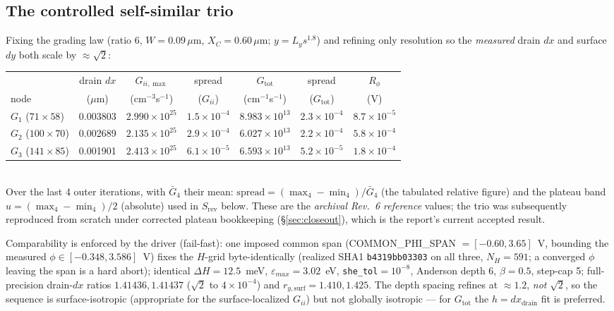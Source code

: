 \documentclass[11pt]{article}
\newcommand{\eps}{\varepsilon}
\begin{document}
\subsection{The controlled self-similar trio}
Fixing the grading law (ratio $6$, $W=0.09\,\mu$m, $X_C=0.60\,\mu$m; $y=L_y s^{1.8}$) and refining
only resolution so the \emph{measured} drain $dx$ and surface $dy$ both scale by $\approx\sqrt2$:
\begin{center}\small
\begin{tabular}{lcccccc}
\toprule
 & drain $dx$ & $G_{ii,\max}$ & spread & $G_{\mathrm{tot}}$ & spread & $R_\phi$\\
node & ($\mu$m) & (cm$^{-3}$s$^{-1}$) & ($G_{ii}$) & (cm$^{-1}$s$^{-1}$) & ($G_{\mathrm{tot}}$) & (V)\\
\midrule
$G_1$ ($71\times58$)  & 0.003803 & $2.990\times10^{25}$ & $1.5\times10^{-4}$ & $8.983\times10^{13}$ & $2.3\times10^{-4}$ & $8.7\times10^{-5}$\\
$G_2$ ($100\times70$) & 0.002689 & $2.135\times10^{25}$ & $2.9\times10^{-4}$ & $6.027\times10^{13}$ & $2.2\times10^{-4}$ & $5.8\times10^{-4}$\\
$G_3$ ($141\times85$) & 0.001901 & $2.413\times10^{25}$ & $6.1\times10^{-5}$ & $6.593\times10^{13}$ & $5.2\times10^{-5}$ & $1.8\times10^{-4}$\\
\bottomrule
\end{tabular}
\\[3pt]
{\footnotesize Over the last 4 outer iterations, with $\bar G_4$ their mean:
$\mathrm{spread}=(\max_4-\min_4)/\bar G_4$ (the tabulated relative figure) and the plateau band
$u=(\max_4-\min_4)/2$ (absolute) used in $S_{\mathrm{rev}}$ below. These are the \emph{archival Rev.~6
reference} values; the trio was subsequently reproduced from scratch under corrected plateau
bookkeeping (\S\ref{sec:closeout}), which is the report's current accepted result.}
\end{center}
Comparability is enforced by the driver (fail-fast): one imposed common span
(COMMON\_PHI\_SPAN $=[-0.60,3.65]$~V, bounding the measured $\phi\in[-0.348,3.586]$~V) fixes the
$H$-grid byte-identically (realized SHA1 \texttt{b4319bb03303} on all three, $N_H=591$; a converged
$\phi$ leaving the span is a hard abort); identical $\Delta H=12.5$~meV, $\eps_{max}=3.02$~eV,
\texttt{she\_tol}$=10^{-8}$, Anderson depth 6, $\beta=0.5$, step-cap 5; full-precision drain-$dx$
ratios $1.41436,1.41437$ ($\sqrt2$ to $4\times10^{-4}$) and $r_{y,\mathrm{surf}}=1.410,1.425$. The
depth spacing refines at $\approx1.2$, \emph{not} $\sqrt2$, so the sequence is surface-isotropic
(appropriate for the surface-localized $G_{ii}$) but not globally isotropic --- for
$G_{\mathrm{tot}}$ the $h=dx_{\mathrm{drain}}$ fit is preferred.
\end{document}

